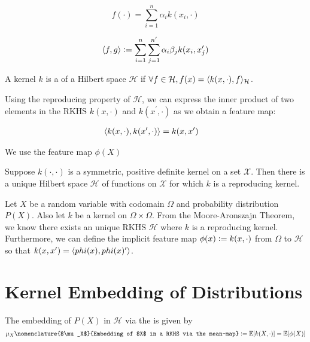 \begin{equation}
	f(\cdot) = \sum_{i=1}^n \alpha_i k(x_i, \cdot)
\end{equation}

\begin{equation}
	\langle f, g\rangle \vcentcolon= \sum_{i=1}^n \sum_{j=1}^{n^\prime} \alpha_i \beta_j k(x_i, x_j^\prime)
\end{equation}

\begin{definition}
	A kernel $k$ is a  of a Hilbert space $\mathcal{H}$ if $\forall f \in \mathcal{H}, f(x) = \langle k(x, \cdot), f\rangle_\mathcal{H}$.
\end{definition}

Using the reproducing property of $\mathcal{H}$, we can express the inner product of two elements in the RKHS $k(x, \cdot)$ and $k(x^\prime, \cdot)$ as we obtain a feature map:

\begin{align}
	\langle k(x, \cdot), k(x^\prime, \cdot)\rangle &= k(x, x^\prime)
\end{align}

We use the feature map $\phi(X)$



\begin{theorem}
Suppose $k(\cdot, \cdot)$ is a symmetric, positive definite kernel on a set $\mathcal{X}$. Then there is a unique Hilbert space $\mathcal{H}$ of functions on $\mathcal{X}$ for which $k$ is a reproducing kernel.
\end{theorem}

Let $X$ be a random variable with codomain $\Omega$ and probability distribution $P(X)$. Also let $k$ be a kernel on $\Omega \times \Omega$. From the Moore-Aronszajn Theorem, we know there exists an unique RKHS $\mathcal{H}$ where $k$ is a reproducing kernel. Furthermore, we can define the implicit feature map $\phi(x) \vcentcolon= k(x, \cdot)$ from $\Omega$ to $\mathcal{H}$ so that $k(x, x^\prime) = \langle phi(x), phi(x)^\prime\rangle$.

\section{Kernel Embedding of Distributions}

\begin{definition}
The embedding of $P(X)$ in $\mathcal{H}$ via the  is given by
\begin{equation}
  \mu_{X}\nomenclature{$\mu_X$}{Embedding of $X$ in a RKHS via the mean-map} \defeq \E[k(X, \cdot)] = \E[\phi(X)]
\end{equation}
\end{definition}

